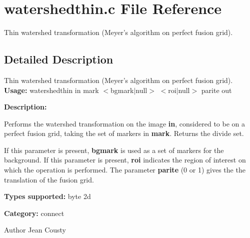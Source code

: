 \section{watershedthin.c File Reference}
\label{watershedthin_8c}


Thin watershed transformation (Meyer's algorithm on perfect fusion grid).  




\subsection{Detailed Description}
Thin watershed transformation (Meyer's algorithm on perfect fusion grid). {\bfseries Usage:} watershedthin in mark $<$bgmark$|$null$>$ $<$roi$|$null$>$ parite out

{\bfseries Description:}

Performs the watershed transformation on the image {\bfseries in}, considered to be on a perfect fusion grid, taking the set of markers in {\bfseries mark}. Returns the divide set.

If this parameter is present, {\bfseries bgmark} is used as a set of markers for the background. If this parameter is present, {\bfseries roi} indicates the region of interest on which the operation is performed. The parameter {\bfseries parite} (0 or 1) gives the the translation of the fusion grid.

{\bfseries Types supported:} byte 2d

{\bfseries Category:} connect

\begin{DoxyAuthor}{Author}
Jean Cousty 
\end{DoxyAuthor}
